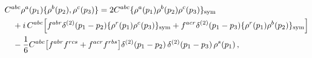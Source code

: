 \begin{align}\label{eq:symr12}
&C^{abc}\rho^{a}(p_{1})\{\rho^{b}(p_{2}),\rho^{c}(p_{3})\}=2C^{abc}\{\rho^{a}(p_{1})\rho^{b}(p_{2})\rho^{c}(p_{3})\}_{\rm sym}\notag\\
&\quad +i\, C^{abc}\Big[f^{abr}\delta^{(2)}(p_{1}-p_{2})\{\rho^{r}(p_{1})\rho^{c}(p_{3})\}_{\rm sym} +f^{acr}\delta^{(2)}(p_{1}-p_{3})\{\rho^{r}(p_{1})\rho^{b}(p_{2})\}_{\rm sym}\Big]\notag\\
&\quad -\frac{1}{6}C^{abc}\big[f^{abr}f^{rcs} +f^{acr}f^{rbs}\big]\delta^{(2)}(p_{1}-p_{2})\, \delta^{(2)}(p_{1}-p_{3})\, \rho^{s}(p_{1})\,,
\end{align}
